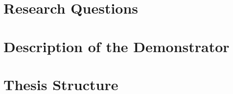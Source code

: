 \section{Research Questions}




\section{Description of the Demonstrator}


\section{Thesis Structure}

